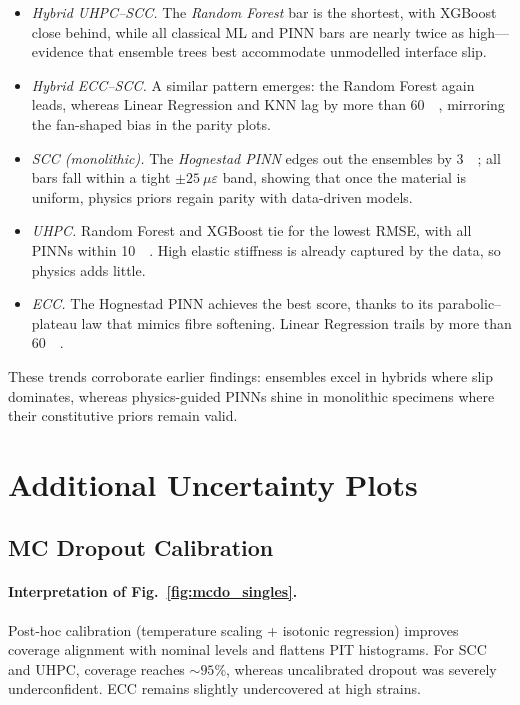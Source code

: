 \documentclass{article}
\begin{document}
\begin{itemize}
  \item \emph{Hybrid UHPC–SCC.}
        The \emph{Random Forest} bar is the shortest, with XGBoost close
        behind, while all classical ML and PINN bars are nearly twice as
        high—evidence that ensemble trees best accommodate unmodelled
        interface slip.

  \item \emph{Hybrid ECC–SCC.}
        A similar pattern emerges: the Random Forest again leads, whereas
        Linear Regression and KNN lag by more than
        \SI{60}{\mu\varepsilon}, mirroring the fan-shaped bias in the
        parity plots.

  \item \emph{SCC (monolithic).}
        The \emph{Hognestad PINN} edges out the ensembles by
        \SI{3}{\mu\varepsilon}; all bars fall within a tight
        \(\pm\!25~\mu\varepsilon\) band, showing that once the material
        is uniform, physics priors regain parity with data-driven models.

  \item \emph{UHPC.}
        Random Forest and XGBoost tie for the lowest RMSE, with all PINNs
        within \SI{10}{\mu\varepsilon}.  High elastic stiffness is
        already captured by the data, so physics adds little.

  \item \emph{ECC.}
        The Hognestad PINN achieves the best score, thanks to its
        parabolic–plateau law that mimics fibre softening.  Linear
        Regression trails by more than \SI{60}{\mu\varepsilon}.
\end{itemize}

These trends corroborate earlier findings: ensembles excel in hybrids
where slip dominates, whereas physics-guided PINNs shine in monolithic
specimens where their constitutive priors remain valid.


\section{Additional Uncertainty Plots}
\label{app:plots}

\subsection{MC Dropout Calibration}
\paragraph{Interpretation of Fig.~\ref{fig:mcdo_singles}.}
Post‐hoc calibration (temperature scaling + isotonic regression) improves coverage alignment with nominal levels and flattens PIT histograms. For SCC and UHPC, coverage reaches $\sim95\%$, whereas uncalibrated dropout was severely underconfident. ECC remains slightly undercovered at high strains.
\end{document}
